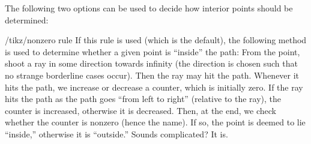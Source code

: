The following two options can be used to decide how interior points
should be determined:
\begin{key}{/tikz/nonzero rule}
  If this rule is used (which is the default), the following method is
  used to determine whether a given point is ``inside'' the path: From
  the point, shoot a ray in some direction towards infinity (the
  direction is chosen such that no strange borderline cases
  occur). Then the ray may hit the path. Whenever it hits the path, we
  increase or decrease a counter, which is initially zero. If the ray
  hits the path as the path goes ``from left to right'' (relative to
  the ray), the counter is increased, otherwise it is decreased. Then,
  at the end, we check whether the counter is nonzero (hence the
  name). If so, the point is deemed to lie ``inside,'' otherwise it is
  ``outside.'' Sounds complicated? It is.

\begin{codeexample}[]
\end{codeexample}
\end{key}

